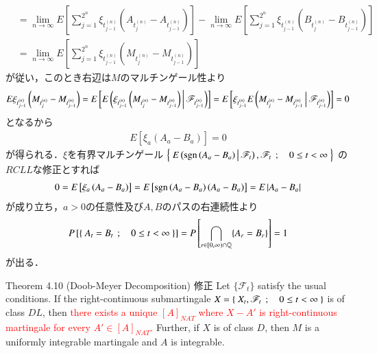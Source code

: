 \begin{prf}
\begin{align}
			&= \lim_{n \to \infty} E\left[ \sum_{j=1}^{2^n}\xi_{t^{(n)}_{j-1}}\left( A_{t^{(n)}_j} - A_{t^{(n)}_{j-1}} \right) \right]
				-  \lim_{n \to \infty} E \left[ \sum_{j=1}^{2^n}\xi_{t^{(n)}_{j-1}}\left( B_{t^{(n)}_j} - B_{t^{(n)}_{j-1}} \right) \right] \\
			&= \lim_{n \to \infty} E \left[ \sum_{j=1}^{2^n}\xi_{t^{(n)}_{j-1}}\left( M_{t^{(n)}_j} - M_{t^{(n)}_{j-1}} \right) \right]
		\end{align}
		が従い，このとき右辺は$M$のマルチンゲール性より
		\begin{align}
			E\xi_{t^{(n)}_{j-1}}\left( M_{t^{(n)}_j} - M_{t^{(n)}_{j-1}} \right)
			= E \left[E\left( \xi_{t^{(n)}_{j-1}}\left( M_{t^{(n)}_j} - M_{t^{(n)}_{j-1}} \right) \, \middle|\, \mathscr{F}_{t^{(n)}_{j-1}} \right) \right]
			= E \left[ \xi_{t^{(n)}_{j-1}}E\left( M_{t^{(n)}_j} - M_{t^{(n)}_{j-1}} \, \middle|\, \mathscr{F}_{t^{(n)}_{j-1}} \right) \right]
			= 0 
		\end{align}
		となるから
		\begin{align}
			E\left[ \xi_a\left( A_a - B_a \right) \right] = 0
		\end{align}
		が得られる．$\xi$を有界マルチンゲール
		$\left\{\ E\left( \operatorname{sgn}\left( A_a - B_a \right) \, \middle|\, \mathscr{F}_t \right),\mathscr{F}_t\ \, ; \quad 0 \leq t < \infty\ \right\}$
		の$RCLL$な修正とすれば
		\begin{align}
			0 = E\left[ \xi_a\left( A_a - B_a \right) \right]
			= E\left[ \operatorname{sgn}\left( A_a - B_a \right)\left( A_a - B_a \right) \right]
			= E\left| A_a - B_a \right|
		\end{align}
		が成り立ち，$a > 0$の任意性及び$A,B$のパスの右連続性より
		\begin{align}
			P\left[ \left\{\ A_t = B_t\ \, ; \quad 0 \leq t < \infty\ \right\}\right]
			= P\left[ \bigcap_{r \in [0,\infty) \cap \mathbb{Q}} \{A_r=B_r\} \right]
			= 1
		\end{align}
		が出る．
		\QED
	\end{prf}
	
	\begin{itembox}[l]{Theorem 4.10 (Doob-Meyer Decomposition) 修正}
		Let $\{\mathscr{F}_t\}$ satisfy the usual conditions. If the right-continuous
		submartingale $X = \left\{\ X_t,\mathscr{F}_t\ \, ; \quad 0 \leq t < \infty\ \right\}$ is of class $DL$, then
		\textcolor{red}{there exists a unique $[A]_{NAT}$ where $X - A'$ is right-continuous martingale
		for every $A' \in [A]_{NAT}$.}
		Further, if $X$ is of class $D$, then $M$ is a uniformly integrable martingale 
		and $A$ is integrable.	
	\end{itembox}
	
